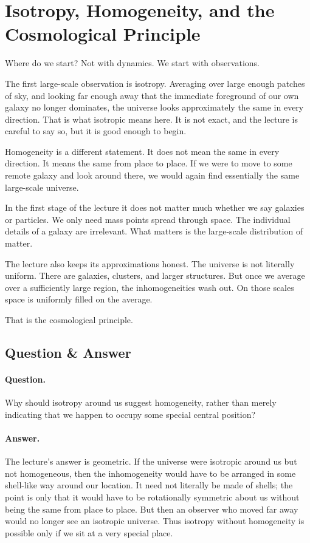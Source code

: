 \section{Isotropy, Homogeneity, and the Cosmological Principle}

Where do we start? Not with dynamics. We start with observations.

The first large-scale observation is isotropy. Averaging over large enough patches of sky, and looking far enough away that the immediate foreground of our own galaxy no longer dominates, the universe looks approximately the same in every direction. That is what isotropic means here. It is not exact, and the lecture is careful to say so, but it is good enough to begin.

Homogeneity is a different statement. It does not mean the same in every direction. It means the same from place to place. If we were to move to some remote galaxy and look around there, we would again find essentially the same large-scale universe.

In the first stage of the lecture it does not matter much whether we say galaxies or particles. We only need mass points spread through space. The individual details of a galaxy are irrelevant. What matters is the large-scale distribution of matter.

The lecture also keeps its approximations honest. The universe is not literally uniform. There are galaxies, clusters, and larger structures. But once we average over a sufficiently large region, the inhomogeneities wash out. On those scales space is uniformly filled on the average.

That is the cosmological principle.

\subsection{Question \& Answer}

\paragraph{Question.} Why should isotropy around us suggest homogeneity, rather than merely indicating that we happen to occupy some special central position?

\paragraph{Answer.} The lecture's answer is geometric. If the universe were isotropic around us but not homogeneous, then the inhomogeneity would have to be arranged in some shell-like way around our location. It need not literally be made of shells; the point is only that it would have to be rotationally symmetric about us without being the same from place to place. But then an observer who moved far away would no longer see an isotropic universe. Thus isotropy without homogeneity is possible only if we sit at a very special place.

